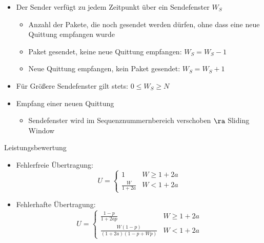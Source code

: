       \begin{itemize}
        \item Der Sender verfügt zu jedem Zeitpunkt über ein Sendefenster $W_S$
        \begin{itemize}
          \item Anzahl der Pakete, die noch gesendet werden dürfen, ohne dass eine neue Quittung
            empfangen wurde
          \item Paket gesendet, keine neue Quittung empfangen: $W_S=W_S-1$
          \item Neue Quittung empfangen, kein Paket gesendet: $W_S=W_S+1$
        \end{itemize}
      \item Für Größere Sendefenster gilt stets: $0\le W_S\ge N$
      \item Empfang einer neuen Quittung
        \begin{itemize}
          \item Sendefenster wird im Sequenznummernbereich verschoben $\ra$ Sliding Window
        \end{itemize}
      \end{itemize}
      Leistungsbewertung
      \begin{itemize}
        \item Fehlerfreie Übertragung:
          $$U=\begin{cases}1 & W\ge1+2a\\\frac{W}{1+2a} & W<1+2a\end{cases}$$
        \item Fehlerhafte Übertragung:
          $$U=\begin{cases}\frac{1-p}{1+2ap} & W\ge1+2a\\\frac{W(1-p)}{(1+2a)(1-p+Wp)} 
          & W<1+2a\end{cases}$$
      \end{itemize}
